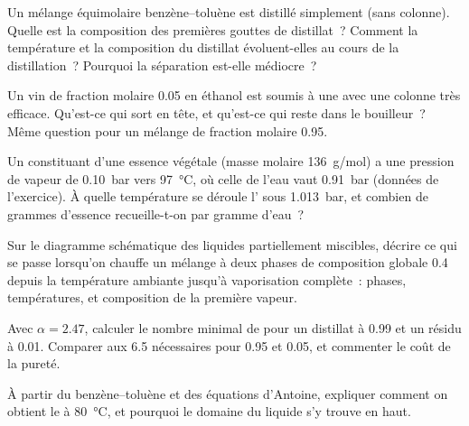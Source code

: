 \begin{exercise}[$\star\star$]\label{exo:b2:liquid-vapour-diagrams:6}
Un mélange équimolaire benzène--toluène est distillé simplement (sans colonne). Quelle est
la composition des premières gouttes de distillat~? Comment la température et
la composition du distillat évoluent-elles au cours de la distillation~? Pourquoi
la séparation est-elle médiocre~?
\end{exercise}

\begin{exercise}[$\star\star$]\label{exo:b2:liquid-vapour-diagrams:7}
Un vin de fraction molaire 0.05 en éthanol est soumis à une  avec une colonne
très efficace. Qu'est-ce qui sort en tête, et qu'est-ce qui reste dans le bouilleur~?
Même question pour un mélange de fraction molaire 0.95.
\end{exercise}

\begin{exercise}[$\star\star$]\label{exo:b2:liquid-vapour-diagrams:8}
Un constituant d'une essence végétale (masse molaire \qty{136}{g/mol}) a une pression
de vapeur de \qty{0.10}{bar} vers \qty{97}{\degreeCelsius}, où celle de l'eau vaut
\qty{0.91}{bar} (données de l'exercice). À quelle température se déroule l' sous \qty{1.013}{bar}, et combien de grammes d'essence
recueille-t-on par gramme d'eau~?
\end{exercise}

\begin{exercise}[$\star\star$]\label{exo:b2:liquid-vapour-diagrams:9}
Sur le diagramme schématique des liquides partiellement miscibles, décrire ce qui se passe
lorsqu'on chauffe un mélange à deux phases de composition globale 0.4 depuis la température
ambiante jusqu'à vaporisation complète~: phases, températures, et composition
de la première vapeur.
\end{exercise}

\begin{exercise}[$\star\star\star$]\label{exo:b2:liquid-vapour-diagrams:10}
Avec $\alpha = 2.47$, calculer le nombre minimal de  pour un
distillat à 0.99 et un résidu à 0.01. Comparer aux 6.5 nécessaires pour 0.95
et 0.05, et commenter le coût de la pureté.
\end{exercise}

\begin{exercise}[$\star\star\star$]\label{exo:b2:liquid-vapour-diagrams:11}
À partir du  benzène--toluène et des équations d'Antoine,
expliquer comment on obtient le  à \qty{80}{\degreeCelsius},
et pourquoi le domaine du liquide s'y trouve en haut.
\end{exercise}

